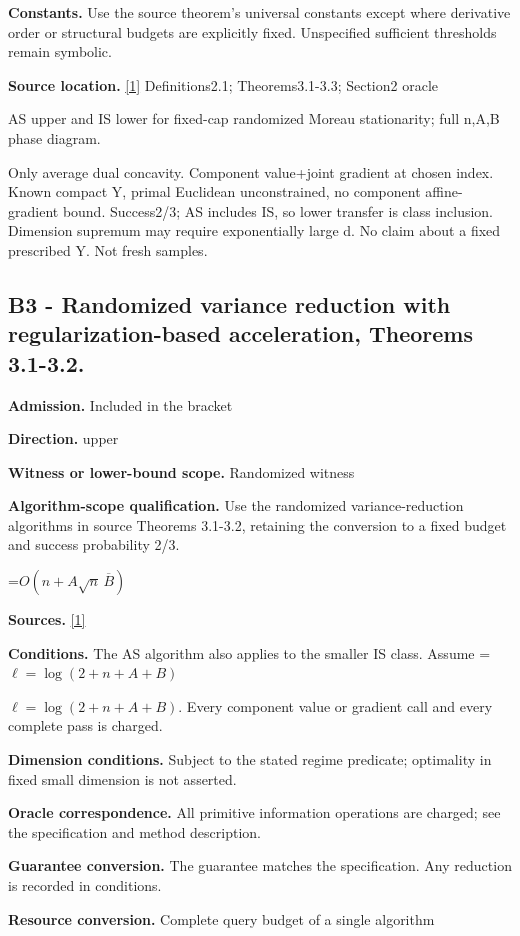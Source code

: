\documentclass[10pt,a4paper]{article}
\newcommand{\AtlasMath}[1]{\par\begingroup\centering\setbox0=\hbox{$\displaystyle #1$}\ifdim\wd0>1.4\linewidth\typeout{ATLAS WIDE FORMULA: \the\wd0}\fi\ifdim\wd0>\linewidth\resizebox{\linewidth}{!}{\box0}\else\box0\fi\par\endgroup}
\newcommand{\AtlasInlineMath}[1]{\begingroup\setbox0=\hbox{$#1$}\ifdim\wd0>.4\linewidth\endgroup\AtlasMath{#1}\else\endgroup$#1$\fi}
\begin{document}
\textbf{Constants.} Use the source theorem’s universal constants except where derivative order or structural budgets are explicitly fixed. Unspecified sufficient thresholds remain symbolic.

\textbf{Source location.} \href{https://arxiv.org/pdf/2610.16991v2}{[1]} Definitions2.1; Theorems3.1-3.3; Section2 oracle

AS upper and IS lower for fixed-cap randomized Moreau stationarity; full n,A,B phase diagram.

Only average dual concavity. Component value+joint gradient at chosen index. Known compact Y, primal Euclidean unconstrained, no component affine-gradient bound. Success2/3; AS includes IS, so lower transfer is class inclusion. Dimension supremum may require exponentially large d. No claim about a fixed prescribed Y. Not fresh samples.

\subsection{B3 - Randomized variance reduction with regularization-based acceleration, Theorems 3.1-3.2.}
\textbf{Admission.} Included in the bracket

\textbf{Direction.} upper

\textbf{Witness or lower-bound scope.} Randomized witness

\textbf{Algorithm-scope qualification.} Use the randomized variance-reduction algorithms in source Theorems 3.1-3.2, retaining the conversion to a fixed budget and success probability 2/3.

\AtlasMath{O(n+A\sqrt n\,\overline B)}
\textbf{Sources.} \href{https://arxiv.org/pdf/2610.16991v2}{[1]}

\textbf{Conditions.} The AS algorithm also applies to the smaller IS class. Assume \AtlasInlineMath{\ell=\log(2+n+A+B)}. Every component value or gradient call and every complete pass is charged.

\textbf{Dimension conditions.} Subject to the stated regime predicate; optimality in fixed small dimension is not asserted.

\textbf{Oracle correspondence.} All primitive information operations are charged; see the specification and method description.

\textbf{Guarantee conversion.} The guarantee matches the specification. Any reduction is recorded in conditions.

\textbf{Resource conversion.} Complete query budget of a single algorithm
\end{document}
